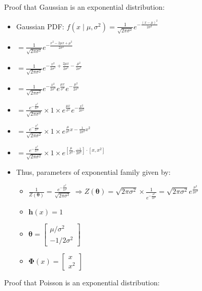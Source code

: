 Proof that Gaussian is an exponential distribution:
\begin{itemize}
    \item Gaussian PDF:
    $
    f(x \mid \mu, \sigma^2) = \frac{1}{\sqrt{2 \pi \sigma^2}} e^{-\frac{(x - \mu)^2}{2 \sigma^2}} $
    \item $= \frac{1}{\sqrt{2 \pi \sigma^2}} e^{-\frac{x^2 - 2 \mu x + \mu^2}{2 \sigma^2}}$
    \item $=\frac{1}{\sqrt{2 \pi \sigma^2}} e^{-\frac{x^2}{2 \sigma^2} + \frac{2 \mu x}{2 \sigma^2} - \frac{\mu^2}{2 \sigma^2}}$
    \item $= \frac{1}{\sqrt{2 \pi \sigma^2}} e^{-\frac{x^2}{2 \sigma^2}} e^{\frac{\mu x}{\sigma^2}} e^{-\frac{\mu^2}{2 \sigma^2}} 
    $
    \item $= \frac{e^{-\frac{\mu^2}{2 \sigma^2}}}{\sqrt{2 \pi \sigma^2}} \times 1 \times e^{\frac{\mu x}{\sigma^2}} e^{-\frac{x^2}{2 \sigma^2}}$
    \item $= \frac{e^{-\frac{\mu^2}{2 \sigma^2}}}{\sqrt{2 \pi \sigma^2}} \times 1 \times e^{\frac{\mu}{\sigma^2}x-\frac{1}{2 \sigma^2} x^2}$
    \item $= \frac{e^{-\frac{\mu^2}{2 \sigma^2}}}{\sqrt{2 \pi \sigma^2}} \times 1 \times e^{[\frac{\mu}{\sigma^2},\frac{-1}{2\sigma^2}] \cdot [x,x^2]}$
    \item Thus, parameters of exponential family given by:
    \begin{itemize}
        \item $\frac{1}{Z(\boldsymbol{\theta})} = \frac{e^{-\frac{\mu^2}{2 \sigma^2}}}{\sqrt{2 \pi \sigma^2}}$
        $ \Rightarrow
        Z(\boldsymbol{\theta}) = \sqrt{2 \pi \sigma^2} \times \frac{1}{e^{-\frac{\mu^2}{2 \sigma^2}}} = \sqrt{2 \pi \sigma^2} e^{\frac{\mu^2}{2 \sigma^2}}
        $
        \item $\boldsymbol{h}(x) = 1$
        \item $\boldsymbol{\theta} = \begin{bmatrix}
        \mu / \sigma^2 \\
        -1 / 2 \sigma^2
        \end{bmatrix}$
        \item $
        \boldsymbol{\Phi}(x) = \begin{bmatrix}
        x \\
        x^2
        \end{bmatrix}
        $
    \end{itemize}
\end{itemize}
Proof that Poisson is an exponential distribution:
